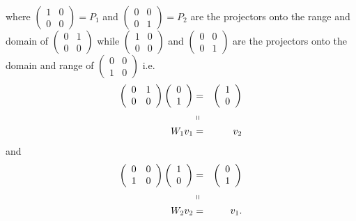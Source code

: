 \documentclass{article}
\begin{document}
where $\left( 
\begin{array}{cc}
1 & 0 \\ 
0 & 0%
\end{array}%
\right) =P_{1}$ and $\left( 
\begin{array}{cc}
0 & 0 \\ 
0 & 1%
\end{array}%
\right) =P_{2}$ are the projectors onto the range and domain of $\left( 
\begin{array}{cc}
0 & 1 \\ 
0 & 0%
\end{array}%
\right) $ while $\left( 
\begin{array}{cc}
1 & 0 \\ 
0 & 0%
\end{array}%
\right) $ and $\left( 
\begin{array}{cc}
0 & 0 \\ 
0 & 1%
\end{array}%
\right) $ are the projectors onto the domain and range of $\left( 
\begin{array}{cc}
0 & 0 \\ 
1 & 0%
\end{array}%
\right) $ i.e. 
\begin{eqnarray}
\left( 
\begin{array}{cc}
0 & 1 \\ 
0 & 0%
\end{array}%
\right) \left( 
\begin{array}{c}
0 \\ 
1%
\end{array}%
\right) &=&\left( 
\begin{array}{c}
1 \\ 
0%
\end{array}%
\right) \\
&\shortparallel & \\
W_{1}v_{1} &=&v_{2}
\end{eqnarray}%
and%
\begin{eqnarray}
\left( 
\begin{array}{cc}
0 & 0 \\ 
1 & 0%
\end{array}%
\right) \left( 
\begin{array}{c}
1 \\ 
0%
\end{array}%
\right) &=&\left( 
\begin{array}{c}
0 \\ 
1%
\end{array}%
\right) \\
&\shortparallel & \\
W_{2}v_{2} &=&v_{1}.
\end{eqnarray}%
\end{document}
